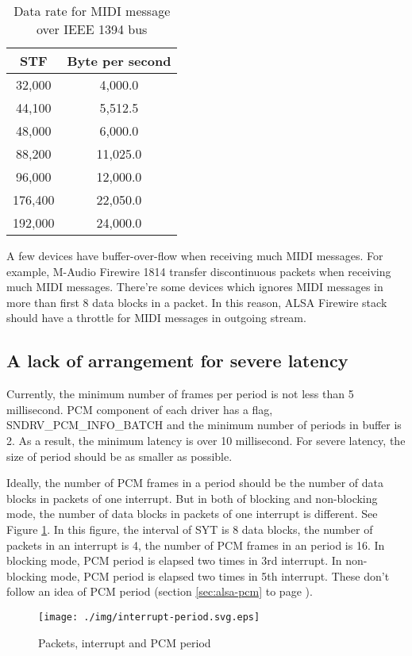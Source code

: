 \documentclass[onecolumn]{article}
\begin{document}
\begin{table}[H]
	\centering
	\caption{{Data rate for MIDI message over IEEE 1394 bus}}
	\label{tbl:midi-rate}
	\begin{tabular}{cc} \toprule
		STF	& Byte per second \\ \midrule
		32,000	& 4,000.0	\\
		44,100	& 5,512.5	\\
		48,000	& 6,000.0	\\
		88,200	& 11,025.0	\\
		96,000	& 12,000.0	\\
		176,400	& 22,050.0	\\
		192,000	& 24,000.0	\\ \bottomrule
	\end{tabular}
\end{table}

A few devices have buffer-over-flow when receiving much MIDI messages. For example, M-Audio Firewire 1814 transfer discontinuous packets when receiving much MIDI messages. There're some devices which ignores MIDI messages in more than first 8 data blocks in a packet.
In this reason, ALSA Firewire stack should have a throttle for MIDI messages in outgoing stream.

\subsection{A lack of arrangement for severe latency}
Currently, the minimum number of frames per period is not less than 5 millisecond. PCM component of each driver has a flag, SNDRV\_PCM\_INFO\_BATCH and the minimum number of periods in buffer is 2. As a result, the minimum latency is over 10 millisecond. For severe latency, the size of period should be as smaller as possible.

Ideally, the number of PCM frames in a period should be the number of data blocks in packets of one interrupt. But in both of blocking and non-blocking mode, the number of data blocks in packets of one interrupt is different. See Figure \ref{fig:interrupt-period}. In this figure, the interval of SYT is 8 data blocks, the number of packets in an interrupt is 4, the number of PCM frames in an period is 16. In blocking mode, PCM period is elapsed two times in 3rd interrupt. In non-blocking mode, PCM period is elapsed two times in 5th interrupt. These don't follow an idea of PCM period (section \ref{sec:alsa-pcm} to page \pageref{sec:alsa-pcm}).

\begin{figure}[H]
	\centering
	\texttt{[image: ./img/interrupt-period.svg.eps]}
	\caption{{Packets, interrupt and PCM period}}
	\label{fig:interrupt-period}
\end{figure}
\end{document}
